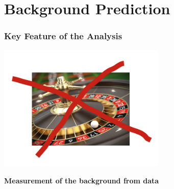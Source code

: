 \documentclass{beamer}
\begin{document}
\section{Background Prediction}
\begin{frame}
  \frametitle{Key Feature of the Analysis}
  \begin{center}
    \includegraphics[width=0.6\textwidth]{figures/NoMC.png}
  \end{center}
  \begin{block}{}
    \centering
    \textbf{Measurement of the \sm background from data}
  \end{block}
\end{frame}
\end{document}
